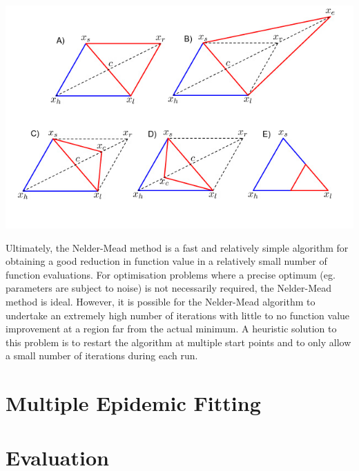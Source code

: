 \documentclass[11pt, a4paper, oneside,titlepage]{article}
\begin{document}
\begin{framed}
\begin{center}
  \includegraphics[width=15cm]{nelder.png}
\end{center}

Ultimately, the Nelder-Mead method is a fast and relatively simple
algorithm for obtaining a good reduction in function value in a
relatively small number of function evaluations. For optimisation
problems where a precise optimum (eg. parameters are subject to noise)
is not necessarily required, the Nelder-Mead method is ideal. However, it is possible for the
Nelder-Mead algorithm to undertake an extremely high number of
iterations with little to no function value improvement at a region
far from the actual minimum. A heuristic solution to this problem is
to restart the algorithm at multiple start points and to only allow a
small number of iterations during each run.\cite{nelder,singer}
 
\end{framed}


\subsection{}



\newpage
\section{Multiple Epidemic Fitting}


\newpage
\section{Evaluation}
\end{document}
